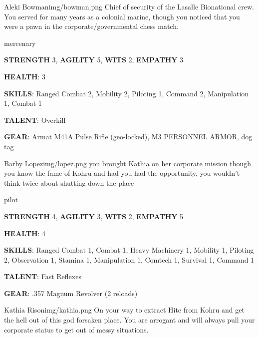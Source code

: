 
\begin{rpg-pcbox}{Aleki Bowman}{img/bowman.png}
    Chief of security of the Lasalle Bionational crew. You served for many years as a colonial marine, though you noticed that you were a pawn in the corporate/governmental chess match.
\end{rpg-pcbox}

\begin{rpg-commentbox}{}
    mercenary

    \textbf{STRENGTH} 3, \textbf{AGILITY} 5, \textbf{WITS} 2, \textbf{EMPATHY} 3

    \textbf{HEALTH}: 3

    \textbf{SKILLS}: Ranged Combat 2, Mobility 2, Piloting 1, Command 2, Manipulation 1, Combat 1
    
    \textbf{TALENT}: Overkill
    
    \textbf{GEAR}: Armat M41A Pulse Rifle (geo-locked), M3 PERSONNEL ARMOR, dog tag
\end{rpg-commentbox}

\newsect

\begin{rpg-pcbox}{Barby Lopez}{img/lopez.png}
    you brought Kathia on her corporate mission though you know the fame of Kohru and had you had the opportunity, you wouldn't think twice about shutting down the place
\end{rpg-pcbox}

\begin{rpg-commentbox}{}
    pilot

    \textbf{STRENGTH} 4, \textbf{AGILITY} 3, \textbf{WITS} 2, \textbf{EMPATHY} 5

    \textbf{HEALTH}: 4

    \textbf{SKILLS}: Ranged Combat 1, Combat 1, Heavy Machinery 1, Mobility 1, Piloting 2, Observation 1, Stamina 1, Manipulation 1, Comtech 1, Survival 1, Command 1
    
    \textbf{TALENT}: Fast Reflexes
    
    \textbf{GEAR}: .357 Magnum Revolver (2 reloads)
\end{rpg-commentbox}


\newsect

\medskip \medskip \medskip \medskip


\begin{rpg-pcbox}{Kathia Rison}{img/kathia.png}
    On your way to extract Hite from Kohru and get the hell out of this god forsaken place.
    You are arrogant and will always pull your corporate status to get out of messy situations.
\end{rpg-pcbox}


